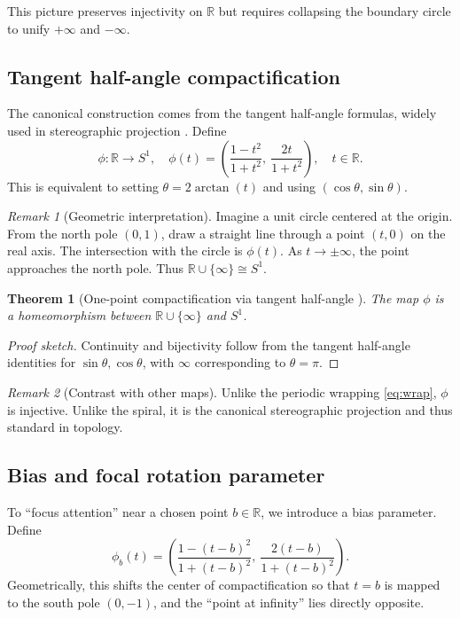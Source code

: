 \documentclass[12pt]{article}
\newtheorem{theorem}{Theorem}
\theoremstyle{remark}
\newtheorem*{remark}{Remark}
\begin{document}
This picture preserves injectivity on $\mathbb{R}$ but requires collapsing the 
boundary circle to unify $+\infty$ and $-\infty$.  

\subsection{Tangent half-angle compactification}
The canonical construction comes from the tangent half-angle formulas, widely 
used in stereographic projection \citep{AhlforsComplex,Needham1997}. Define
\begin{equation}\label{eq:tangent}
\phi:\mathbb{R}\to S^1, \quad
\phi(t) = \left(\frac{1-t^2}{1+t^2},\ \frac{2t}{1+t^2}\right), \quad t\in\mathbb{R}.
\end{equation}
This is equivalent to setting $\theta = 2\arctan(t)$ and using 
$(\cos\theta,\sin\theta)$. 

\begin{remark}[Geometric interpretation]
Imagine a unit circle centered at the origin. From the north pole $(0,1)$, draw a 
straight line through a point $(t,0)$ on the real axis. The intersection with the 
circle is $\phi(t)$. As $t\to\pm\infty$, the point approaches the north pole. Thus 
$\mathbb{R}\cup\{\infty\}\cong S^1$.
\end{remark}

\begin{theorem}[One-point compactification via tangent half-angle {\citep{Munkres2000}}]\label{thm:tangent}
The map $\phi$ is a homeomorphism between $\mathbb{R}\cup\{\infty\}$ and $S^1$.  
\end{theorem}

\begin{proof}[Proof sketch]
Continuity and bijectivity follow from the tangent half-angle identities for 
$\sin\theta,\cos\theta$, with $\infty$ corresponding to $\theta=\pi$.  
\end{proof}

\begin{remark}[Contrast with other maps]
Unlike the periodic wrapping \eqref{eq:wrap}, $\phi$ is injective. Unlike the spiral, 
it is the canonical stereographic projection and thus standard in topology.  
\end{remark}

\subsection{Bias and focal rotation parameter}
To “focus attention” near a chosen point $b\in\mathbb{R}$, we introduce a bias 
parameter. Define
\begin{equation}\label{eq:bias}
\phi_b(t) = \left(\frac{1-(t-b)^2}{1+(t-b)^2},\ \frac{2(t-b)}{1+(t-b)^2}\right).
\end{equation}
Geometrically, this shifts the center of compactification so that $t=b$ is mapped 
to the south pole $(0,-1)$, and the “point at infinity” lies directly opposite.  
\end{document}
